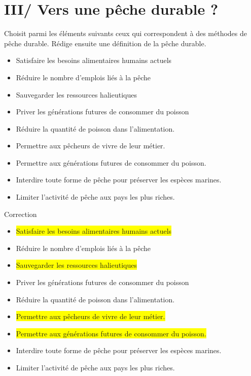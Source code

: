 \documentclass{beamer}
\begin{document}
 \section{III/ Vers une pêche durable ?}
 Choisit parmi les éléments suivants ceux qui correspondent à des méthodes de pêche durable. Rédige ensuite une définition de la pêche durable.
 \begin{itemize}
 \item Satisfaire les besoins alimentaires humains actuels
 \item Réduire le nombre d'emplois liés à la pêche
 \item Sauvegarder les ressources halieutiques
 \item Priver les générations futures de consommer du poisson
 \item Réduire la quantité de poisson dans l'alimentation.
 \item Permettre aux pêcheurs de vivre de leur métier.
 \item Permettre aux générations futures de consommer du poisson.
 \item Interdire toute forme de pêche pour préserver les espèces marines.
 \item Limiter l'activité de pêche aux pays les plus riches.
 \end{itemize}
 
 \begin{frame} Correction
 \begin{itemize}
  \item \pause[1]\colorbox{yellow}{Satisfaire les besoins alimentaires humains actuels}
  \item Réduire le nombre d'emplois liés à la pêche
  \item \pause[2]\colorbox{yellow}{Sauvegarder les ressources halieutiques}
  \item Priver les générations futures de consommer du poisson
  \item Réduire la quantité de poisson dans l'alimentation.
  \item \pause[3]\colorbox{yellow}{Permettre aux pêcheurs de vivre de leur métier.}
  \item \pause[4]\colorbox{yellow}{Permettre aux générations futures de consommer du poisson.}
  \item Interdire toute forme de pêche pour préserver les espèces marines.
  \item Limiter l'activité de pêche aux pays les plus riches.
  \end{itemize}
 \end{frame}
 
\end{document}
